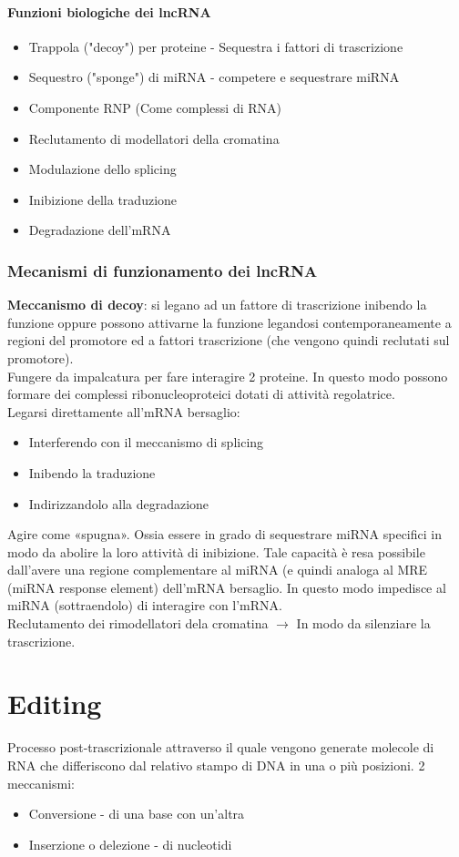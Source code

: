 \documentclass{article}
\begin{document}
\paragraph{Funzioni biologiche dei lncRNA}
\begin{itemize}
    \item Trappola ("decoy") per proteine - Sequestra i fattori di trascrizione
    \item Sequestro ("sponge") di miRNA - competere e sequestrare miRNA
    \item Componente RNP (Come complessi di RNA)
    \item Reclutamento di modellatori della cromatina
    \item Modulazione dello splicing
    \item Inibizione della traduzione
    \item Degradazione dell'mRNA
\end{itemize}
\subsubsection{Mecanismi di funzionamento dei lncRNA}
\textbf{Meccanismo di decoy}: si legano ad un fattore di trascrizione inibendo la funzione oppure possono attivarne la funzione
legandosi contemporaneamente a regioni del promotore ed a fattori trascrizione (che vengono quindi reclutati sul promotore).\\
Fungere da impalcatura per fare interagire 2 proteine. In questo modo possono formare dei complessi ribonucleoproteici dotati di attività regolatrice.\\
Legarsi direttamente all'mRNA bersaglio:
\begin{itemize}
    \item Interferendo con il meccanismo di splicing
    \item Inibendo la traduzione
    \item Indirizzandolo alla degradazione
\end{itemize}
Agire come «spugna». Ossia essere in grado di sequestrare miRNA specifici in modo da abolire la loro attività di inibizione. Tale capacità è
resa possibile dall'avere una regione complementare al miRNA (e quindi analoga al MRE (miRNA response element) dell'mRNA
bersaglio. In questo modo impedisce al miRNA (sottraendolo) di interagire con l'mRNA.\\
Reclutamento dei rimodellatori dela cromatina $\rightarrow$ In modo da silenziare la trascrizione.
\section{Editing}
Processo post-trascrizionale attraverso il quale vengono generate molecole di RNA che differiscono dal relativo stampo di DNA in una o più posizioni.
2 meccanismi:
\begin{itemize}
    \item Conversione - di una base con un'altra
    \item Inserzione o delezione - di nucleotidi
\end{itemize}
\end{document}
